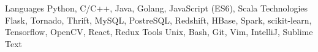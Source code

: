 \begin{cvskills}
  \cvskill
    {Languages}
    {Python, C/C++, Java, Golang, JavaScript (ES6), Scala}
  \cvskill
    {Technologies}
    {Flask, Tornado, Thrift, MySQL, PostreSQL, Redshift, HBase, Spark, scikit-learn, Tensorflow, OpenCV, React, Redux}
  \cvskill
    {Tools}
    {Unix, Bash, Git, Vim, IntelliJ, Sublime Text}
\end{cvskills}

